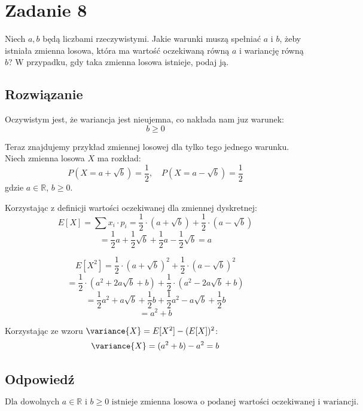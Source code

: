\section{Zadanie 8}
Niech \( a, b \) będą liczbami rzeczywistymi. Jakie warunki muszą spełniać \( a \) i \( b \), żeby istniała zmienna losowa, która ma wartość oczekiwaną równą \( a \) i wariancję równą \( b \)?
W przypadku, gdy taka zmienna losowa istnieje, podaj ją.

\subsection*{Rozwiązanie}
Oczywistym jest, że wariancja jest nieujemna, co nakłada nam juz warunek: \[b \geq 0\]

Teraz znajdujemy przykład zmiennej losowej dla tylko tego jednego warunku. Niech zmienna losowa \(X\) ma rozkład:
\[
	P(X = a + \sqrt{b}) = \frac{1}{2}, \quad P(X = a - \sqrt{b}) = \frac{1}{2}
\]
gdzie \(a \in \mathbb{R}\), \(b \geq 0\).


Korzystając z definicji wartości oczekiwanej dla zmiennej dyskretnej:
\[
	E[X] = \sum x_i \cdot p_i = \frac{1}{2} \cdot (a + \sqrt{b}) + \frac{1}{2} \cdot (a - \sqrt{b})
\]
\[
	= \frac{1}{2}a + \frac{1}{2}\sqrt{b} + \frac{1}{2}a - \frac{1}{2}\sqrt{b} = a
\]


\[
	E[X^2] = \frac{1}{2} \cdot (a + \sqrt{b})^2 + \frac{1}{2} \cdot (a - \sqrt{b})^2
\]
\[
	= \frac{1}{2} \cdot (a^2 + 2a\sqrt{b} + b) + \frac{1}{2} \cdot (a^2 - 2a\sqrt{b} + b)
\]
\[
	= \frac{1}{2}a^2 + a\sqrt{b} + \frac{1}{2}b + \frac{1}{2}a^2 - a\sqrt{b} + \frac{1}{2}b
\]
\[
	= a^2 + b
\]


Korzystając ze wzoru \(\variance{X} = E[X^2] - (E[X])^2\):
\[
	\variance{X} = (a^2 + b) - a^2 = b
\]


\subsection*{Odpowiedź}
\[
	\boxed{\text{Dla dowolnych \(a \in \mathbb{R}\) i \(b \geq 0\) istnieje zmienna losowa o podanej wartości oczekiwanej i wariancji.}}
\]
